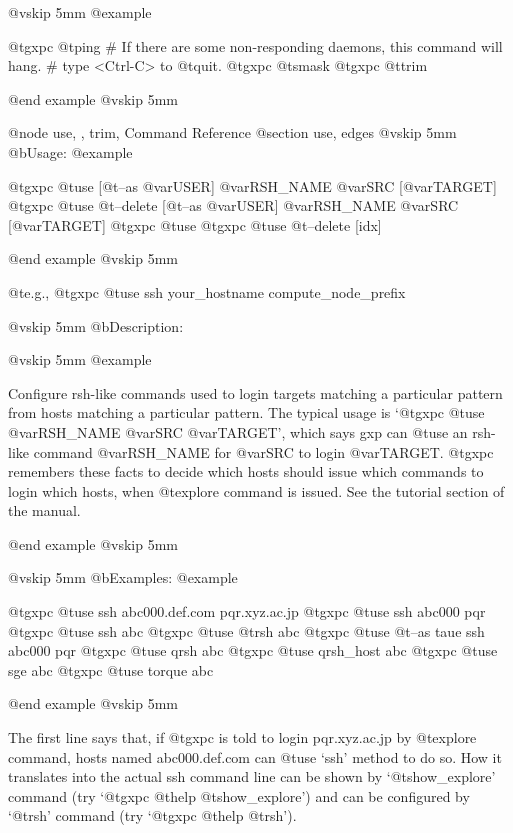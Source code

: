 @vskip 5mm
@example

  @t{gxpc} @t{ping}
  # If there are some non-responding daemons, this command will hang.
  # type <Ctrl-C> to @t{quit}.
  @t{gxpc} @t{smask}
  @t{gxpc} @t{trim}

@end example
@vskip 5mm

@node use,  , trim, Command Reference
@section use, edges
@vskip 5mm
@b{Usage:}
@example

  @t{gxpc} @t{use}          [@t{--as} @var{USER}] @var{RSH_NAME} @var{SRC} [@var{TARGET}]
  @t{gxpc} @t{use} @t{--delete} [@t{--as} @var{USER}] @var{RSH_NAME} @var{SRC} [@var{TARGET}]
  @t{gxpc} @t{use}
  @t{gxpc} @t{use} @t{--delete} [idx]

@end example
@vskip 5mm

  @t{e}.g.,
  @t{gxpc} @t{use} ssh your_hostname compute_node_prefix

@vskip 5mm
@b{Description:}



@vskip 5mm
@example

  Configure rsh-like commands used to login targets matching a
particular pattern from hosts matching a particular pattern. The
typical usage is `@t{gxpc} @t{use} @var{RSH_NAME} @var{SRC} @var{TARGET}', which says gxp can
@t{use} an rsh-like command @var{RSH_NAME} for @var{SRC} to login @var{TARGET}. @t{gxpc}
remembers these facts to decide which hosts should issue which
commands to login which hosts, when @t{explore} command is issued. See the
tutorial section of the manual.

@end example
@vskip 5mm

@vskip 5mm
@b{Examples:}
@example

  @t{gxpc} @t{use}           ssh abc000.def.com pqr.xyz.ac.jp
  @t{gxpc} @t{use}           ssh abc000 pqr
  @t{gxpc} @t{use}           ssh abc
  @t{gxpc} @t{use}           @t{rsh} abc
  @t{gxpc} @t{use} @t{--as} taue ssh abc000 pqr
  @t{gxpc} @t{use} qrsh      abc
  @t{gxpc} @t{use} qrsh_host abc
  @t{gxpc} @t{use} sge       abc
  @t{gxpc} @t{use} torque    abc

@end example
@vskip 5mm

The first line says that, if @t{gxpc} is told to login pqr.xyz.ac.jp by
@t{explore} command, hosts named abc000.def.com can @t{use} `ssh' method to do
so.  How it translates into the actual ssh command line can be shown
by `@t{show_explore}' command (try `@t{gxpc} @t{help} @t{show_explore}') and can be
configured by `@t{rsh}' command (try `@t{gxpc} @t{help} @t{rsh}').

